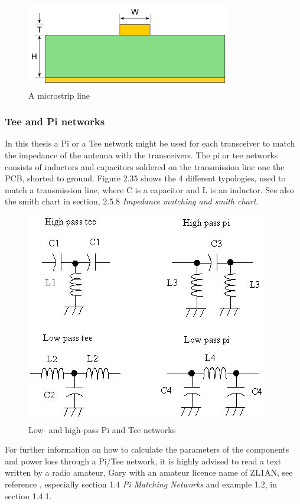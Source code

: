 \begin{figure}[h]
\centering
\includegraphics[scale=0.7]{figures/Microstrip.PNG}
\caption{A microstrip line}
\end{figure}

\subsubsection{Tee and Pi networks}
In this thesis a Pi or a Tee network might be used for each transceiver to match the impedance of the antenna with the transceivers. The pi or tee networks consists of inductors and capacitors soldered on the transmission line one the PCB, shorted to ground. Figure 2.35 shows the 4 different typologies, used to match a transmission line, where C is a capacitor and L is an inductor. See also the smith chart in section, 2.5.8 \textit{Impedance matching and smith chart}.  

\begin{figure}[h]
\centering
\includegraphics[scale=0.70]{figures/PiTee.PNG}
\caption{Low- and high-pass Pi and Tee networks}
\end{figure}

For further information on how to calculate the parameters of the components and power loss through a Pi/Tee network, it is highly advised to read a text written by a radio amateur, Gary with an amateur licence name of ZL1AN, see reference \cite{PiTeeNetwork}, especially section 1.4 \textit{Pi Matching Networks} and example 1.2, in section 1.4.1.

